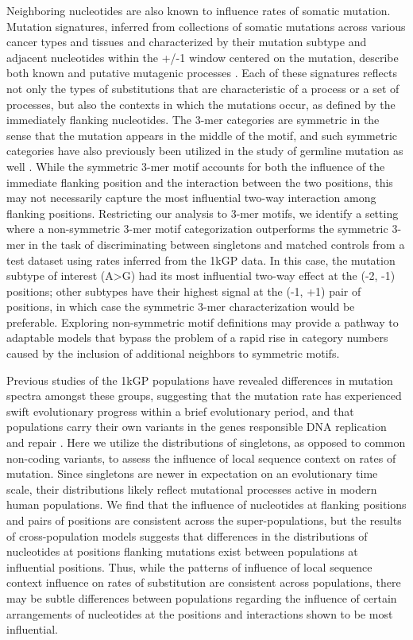 Neighboring nucleotides are also known to influence rates of somatic mutation. Mutation signatures, inferred from collections of somatic mutations across various cancer types and tissues and characterized by their mutation subtype and adjacent nucleotides within the +/-1 window centered on the mutation, describe both known and putative mutagenic processes \citep{Alexandrov2020}. Each of these signatures reflects not only the types of substitutions that are characteristic of a process or a set of processes, but also the contexts in which the mutations occur, as defined by the immediately flanking nucleotides. The 3-mer categories are symmetric in the sense that the mutation appears in the middle of the motif, and such symmetric categories have also previously been utilized in the study of germline mutation as well \citep{Aggarwala2016, Carlson2018, Harris2017}. While the symmetric 3-mer motif accounts for both the influence of the immediate flanking position and the interaction between the two positions, this may not necessarily capture the most influential two-way interaction among flanking positions. Restricting our analysis to 3-mer motifs, we identify a setting where a non-symmetric 3-mer motif categorization outperforms the symmetric 3-mer in the task of discriminating between singletons and matched controls from a test dataset using rates inferred from the 1kGP data. In this case, the mutation subtype of interest (A>G) had its most influential two-way effect at the (-2, -1) positions; other subtypes have their highest signal at the (-1, +1) pair of positions, in which case the symmetric 3-mer characterization would be preferable. Exploring non-symmetric motif definitions may provide a pathway to adaptable models that bypass the problem of a rapid rise in category numbers caused by the inclusion of additional neighbors to symmetric motifs.

Previous studies of the 1kGP populations have revealed differences in mutation spectra amongst these groups, suggesting that the mutation rate has experienced swift evolutionary progress within a brief evolutionary period, and that populations carry their own variants in the genes responsible DNA replication and repair \citep{Harris2017}. Here we utilize the distributions of singletons, as opposed to common non-coding variants, to assess the influence of local sequence context on rates of mutation. Since singletons are newer in expectation on an evolutionary time scale, their distributions likely reflect mutational processes active in modern human populations. We find that the influence of nucleotides at flanking positions and pairs of positions are consistent across the super-populations, but the results of cross-population models suggests that differences in the distributions of nucleotides at positions flanking mutations exist between populations at influential positions. Thus, while the patterns of influence of local sequence context influence on rates of substitution are consistent across populations, there may be subtle differences between populations regarding the influence of certain arrangements of nucleotides at the positions and interactions shown to be most influential. 

